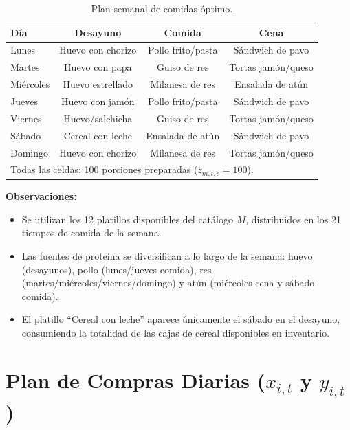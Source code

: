 \documentclass[12pt]{report}
\begin{document}
\begin{table}[H]
\centering
\renewcommand{\arraystretch}{1.35}
\begin{tabular}{lccc}
\toprule
\textbf{Día} & \textbf{Desayuno} & \textbf{Comida} & \textbf{Cena} \\
\midrule
Lunes      & Huevo con chorizo  & Pollo frito/pasta  & Sándwich de pavo   \\
Martes     & Huevo con papa     & Guiso de res       & Tortas jamón/queso \\
Miércoles  & Huevo estrellado   & Milanesa de res    & Ensalada de atún   \\
Jueves     & Huevo con jamón    & Pollo frito/pasta  & Sándwich de pavo   \\
Viernes    & Huevo/salchicha    & Guiso de res       & Tortas jamón/queso \\
Sábado     & Cereal con leche   & Ensalada de atún   & Sándwich de pavo   \\
Domingo    & Huevo con chorizo  & Milanesa de res    & Tortas jamón/queso \\
\midrule
\multicolumn{4}{l}{\small Todas las celdas: 100 porciones preparadas ($z_{m,t,c} = 100$).} \\
\bottomrule
\end{tabular}
\caption{Plan semanal de comidas óptimo.}
\label{tab:menu}
\end{table}

\noindent\textbf{Observaciones:}
\begin{itemize}
    \item Se utilizan los 12 platillos disponibles del catálogo $M$, distribuidos
          en los 21 tiempos de comida de la semana.
    \item Las fuentes de proteína se diversifican a lo largo de la semana:
          huevo (desayunos), pollo (lunes/jueves comida), res (martes/miércoles/viernes/domingo)
          y atún (miércoles cena y sábado comida).
    \item El platillo ``Cereal con leche'' aparece únicamente el sábado en el desayuno,
          consumiendo la totalidad de las cajas de cereal disponibles en inventario.
\end{itemize}

\section{Plan de Compras Diarias ($x_{i,t}$ y $y_{i,t}$)}
\end{document}
